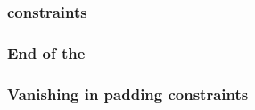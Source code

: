 \subsubsection{\romColumnLimbIndex{} constraints}                                               \label{rom: generalities: index}                            
\subsubsection{End of the \romColumnCfi{}}                                                      \label{rom: generalities: end of cfi}                       
\subsubsection{Vanishing in padding constraints}                                                \label{rom: generalities: vanishing in padding}             

